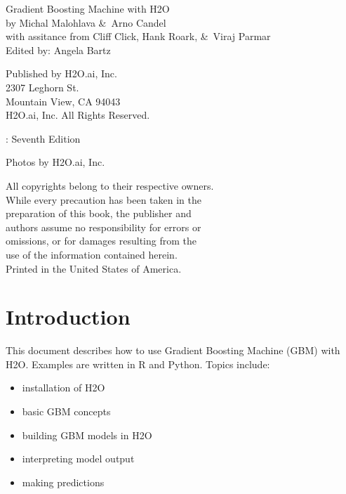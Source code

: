 {\raggedright 

Gradient Boosting Machine with H2O\\

 by Michal Malohlava \&\  Arno Candel\\
 with assitance from Cliff Click, Hank Roark, \&\ Viraj Parmar \\
Edited by: Angela Bartz

\bigskip
  Published by H2O.ai, Inc. \\
2307 Leghorn St. \\
Mountain View, CA 94043\\
\bigskip
\textcopyright \the\year \hspace{1pt} H2O.ai, Inc. All Rights Reserved. 
\bigskip

\monthname \hspace{1pt}  \the\year: Seventh Edition
\bigskip

Photos by \textcopyright H2O.ai, Inc.
\bigskip

All copyrights belong to their respective owners.\\
While every precaution has been taken in the\\
preparation of this book, the publisher and\\
authors assume no responsibility for errors or\\
omissions, or for damages resulting from the\\
use of the information contained herein.\\
\bigskip
Printed in the United States of America. 
}


\newpage
\thispagestyle{empty}%

\tableofcontents


\newpage

\section{Introduction}
This document describes how to use Gradient Boosting Machine (GBM) with H2O.  
Examples are written in R and Python.
Topics include: 
\begin{itemize}
\item installation of H2O
\item basic GBM concepts
\item building GBM models in H2O
\item interpreting model output
\item making predictions
\end{itemize}


